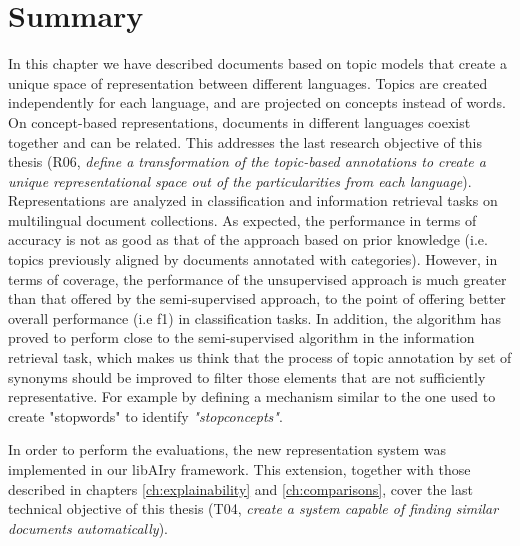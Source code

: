 \section{Summary}
\label{sec:crosslingual-summary}

In this chapter we have described documents based on topic models that create a unique space of representation between different languages. Topics are created independently for each language, and are projected on concepts instead of words. On concept-based representations, documents in different languages coexist together and can be related. This addresses the last research objective of this thesis (R06, \textit{define a transformation of the topic-based annotations to create a unique representational space out of the particularities from each language}). Representations are analyzed in classification and information retrieval tasks on multilingual document collections. As expected, the performance in terms of accuracy is not as good as that of the approach based on prior knowledge (i.e. topics previously aligned by documents annotated with categories). However, in terms of coverage, the performance of the unsupervised approach is much greater than that offered by the semi-supervised approach, to the point of offering better overall performance (i.e f1) in classification tasks. 
In addition, the algorithm has proved to perform close to the semi-supervised algorithm in the information retrieval task, which makes us think that the process of topic annotation by set of synonyms should be improved to filter those elements that are not sufficiently representative. For example by defining a mechanism similar to the one used to create "stopwords" to identify \textit{"stopconcepts"}. 

In order to perform the evaluations, the new representation system was implemented in our libAIry framework. This extension, together with those described in chapters \ref{ch:explainability} and \ref{ch:comparisons}, cover the last technical objective of this thesis (T04, \textit{create a system capable of finding similar documents automatically}). 